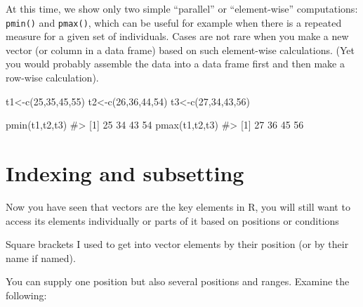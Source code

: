 \documentclass[
  letterpaper,
  DIV=11,
  numbers=noendperiod]{scrreprt}
\newenvironment{Shaded}{\begin{snugshade}}{\end{snugshade}}
\newcommand{\CommentTok}[1]{\textcolor[rgb]{0.37,0.37,0.37}{#1}}
\newcommand{\DecValTok}[1]{\textcolor[rgb]{0.68,0.00,0.00}{#1}}
\newcommand{\FunctionTok}[1]{\textcolor[rgb]{0.28,0.35,0.67}{#1}}
\newcommand{\NormalTok}[1]{\textcolor[rgb]{0.00,0.23,0.31}{#1}}
\newcommand{\OtherTok}[1]{\textcolor[rgb]{0.00,0.23,0.31}{#1}}
\begin{document}
At this time, we show only two simple ``parallel'' or ``element-wise''
computations: \texttt{pmin()} and \texttt{pmax()}, which can be useful
for example when there is a repeated measure for a given set of
individuals. Cases are not rare when you make a new vector (or column in
a data frame) based on such element-wise calculations. (Yet you would
probably assemble the data into a data frame first and then make a
row-wise calculation).

\begin{Shaded}
\begin{Highlighting}[]
\NormalTok{t1}\OtherTok{\textless{}{-}}\FunctionTok{c}\NormalTok{(}\DecValTok{25}\NormalTok{,}\DecValTok{35}\NormalTok{,}\DecValTok{45}\NormalTok{,}\DecValTok{55}\NormalTok{)}
\NormalTok{t2}\OtherTok{\textless{}{-}}\FunctionTok{c}\NormalTok{(}\DecValTok{26}\NormalTok{,}\DecValTok{36}\NormalTok{,}\DecValTok{44}\NormalTok{,}\DecValTok{54}\NormalTok{)}
\NormalTok{t3}\OtherTok{\textless{}{-}}\FunctionTok{c}\NormalTok{(}\DecValTok{27}\NormalTok{,}\DecValTok{34}\NormalTok{,}\DecValTok{43}\NormalTok{,}\DecValTok{56}\NormalTok{)}

\FunctionTok{pmin}\NormalTok{(t1,t2,t3)}
\CommentTok{\#\textgreater{} [1] 25 34 43 54}
\FunctionTok{pmax}\NormalTok{(t1,t2,t3)}
\CommentTok{\#\textgreater{} [1] 27 36 45 56}
\end{Highlighting}
\end{Shaded}

\section{Indexing and subsetting}\label{indexing-and-subsetting}

Now you have seen that vectors are the key elements in R, you will still
want to access its elements individually or parts of it based on
positions or conditions

Square brackets I used to get into vector elements by their position (or
by their name if named).

You can supply one position but also several positions and ranges.
Examine the following:
\end{document}
